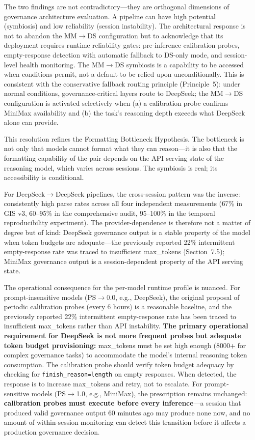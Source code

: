 \documentclass[11pt,a4paper]{article}
\begin{document}
The two findings are not contradictory---they are orthogonal dimensions of governance architecture evaluation. A pipeline can have high potential (symbiosis) and low reliability (session instability). The architectural response is not to abandon the MM$\rightarrow$DS configuration but to acknowledge that its deployment requires runtime reliability gates: pre-inference calibration probes, empty-response detection with automatic fallback to DS-only mode, and session-level health monitoring. The MM$\rightarrow$DS symbiosis is a capability to be accessed when conditions permit, not a default to be relied upon unconditionally. This is consistent with the conservative fallback routing principle (Principle~5): under normal conditions, governance-critical layers route to DeepSeek; the MM$\rightarrow$DS configuration is activated selectively when (a) a calibration probe confirms MiniMax availability and (b) the task's reasoning depth exceeds what DeepSeek alone can provide.

This resolution refines the Formatting Bottleneck Hypothesis. The bottleneck is not only that models cannot format what they can reason---it is also that the formatting capability of the pair depends on the API serving state of the reasoning model, which varies across sessions. The symbiosis is real; its accessibility is conditional.

For DeepSeek$\rightarrow$DeepSeek pipelines, the cross-session pattern was the inverse: consistently high parse rates across all four independent measurements (67\% in GIS v3, 60--95\% in the comprehensive audit, 95--100\% in the temporal reproducibility experiment). The provider-dependence is therefore not a matter of degree but of kind: DeepSeek governance output is a stable property of the model when token budgets are adequate---the previously reported 22\% intermittent empty-response rate was traced to insufficient max\_tokens (Section~7.5); MiniMax governance output is a session-dependent property of the API serving state.

The operational consequence for the per-model runtime profile is nuanced. For prompt-insensitive models (PS$\rightarrow$0.0, e.g., DeepSeek), the original proposal of periodic calibration probes (every 6 hours) is a reasonable baseline, and the previously reported 22\% intermittent empty-response rate has been traced to insufficient max\_tokens rather than API instability. \textbf{The primary operational requirement for DeepSeek is not more frequent probes but adequate token budget provisioning:} max\_tokens must be set high enough (8000+ for complex governance tasks) to accommodate the model's internal reasoning token consumption. The calibration probe should verify token budget adequacy by checking for \texttt{finish\_reason=length} on empty responses. When detected, the response is to increase max\_tokens and retry, not to escalate. For prompt-sensitive models (PS$\rightarrow$1.0, e.g., MiniMax), the prescription remains unchanged: \textbf{calibration probes must execute before every inference}---a session that produced valid governance output 60 minutes ago may produce none now, and no amount of within-session monitoring can detect this transition before it affects a production governance decision.
\end{document}
